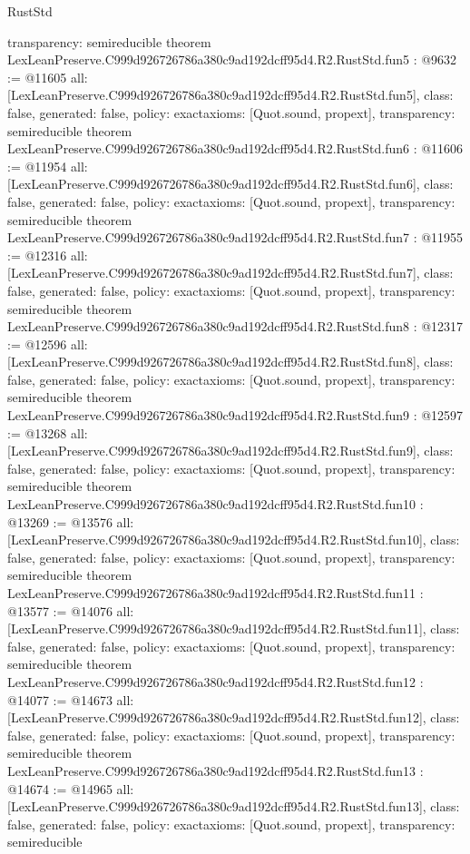 \begin{lexlean}{RustStd}
\begin{coremodule}
{  transparency: semireducible
}
theorem LexLeanPreserve.C999d926726786a380c9ad192dcff95d4.R2.RustStd.fun5 : @9632 := @11605 {
  all: [LexLeanPreserve.C999d926726786a380c9ad192dcff95d4.R2.RustStd.fun5],
  class: false,
  generated: false,
  policy: exact{axioms: [Quot.sound, propext]},
  transparency: semireducible
}
theorem LexLeanPreserve.C999d926726786a380c9ad192dcff95d4.R2.RustStd.fun6 : @11606 := @11954 {
  all: [LexLeanPreserve.C999d926726786a380c9ad192dcff95d4.R2.RustStd.fun6],
  class: false,
  generated: false,
  policy: exact{axioms: [Quot.sound, propext]},
  transparency: semireducible
}
theorem LexLeanPreserve.C999d926726786a380c9ad192dcff95d4.R2.RustStd.fun7 : @11955 := @12316 {
  all: [LexLeanPreserve.C999d926726786a380c9ad192dcff95d4.R2.RustStd.fun7],
  class: false,
  generated: false,
  policy: exact{axioms: [Quot.sound, propext]},
  transparency: semireducible
}
theorem LexLeanPreserve.C999d926726786a380c9ad192dcff95d4.R2.RustStd.fun8 : @12317 := @12596 {
  all: [LexLeanPreserve.C999d926726786a380c9ad192dcff95d4.R2.RustStd.fun8],
  class: false,
  generated: false,
  policy: exact{axioms: [Quot.sound, propext]},
  transparency: semireducible
}
theorem LexLeanPreserve.C999d926726786a380c9ad192dcff95d4.R2.RustStd.fun9 : @12597 := @13268 {
  all: [LexLeanPreserve.C999d926726786a380c9ad192dcff95d4.R2.RustStd.fun9],
  class: false,
  generated: false,
  policy: exact{axioms: [Quot.sound, propext]},
  transparency: semireducible
}
theorem LexLeanPreserve.C999d926726786a380c9ad192dcff95d4.R2.RustStd.fun10 : @13269 := @13576 {
  all: [LexLeanPreserve.C999d926726786a380c9ad192dcff95d4.R2.RustStd.fun10],
  class: false,
  generated: false,
  policy: exact{axioms: [Quot.sound, propext]},
  transparency: semireducible
}
theorem LexLeanPreserve.C999d926726786a380c9ad192dcff95d4.R2.RustStd.fun11 : @13577 := @14076 {
  all: [LexLeanPreserve.C999d926726786a380c9ad192dcff95d4.R2.RustStd.fun11],
  class: false,
  generated: false,
  policy: exact{axioms: [Quot.sound, propext]},
  transparency: semireducible
}
theorem LexLeanPreserve.C999d926726786a380c9ad192dcff95d4.R2.RustStd.fun12 : @14077 := @14673 {
  all: [LexLeanPreserve.C999d926726786a380c9ad192dcff95d4.R2.RustStd.fun12],
  class: false,
  generated: false,
  policy: exact{axioms: [Quot.sound, propext]},
  transparency: semireducible
}
theorem LexLeanPreserve.C999d926726786a380c9ad192dcff95d4.R2.RustStd.fun13 : @14674 := @14965 {
  all: [LexLeanPreserve.C999d926726786a380c9ad192dcff95d4.R2.RustStd.fun13],
  class: false,
  generated: false,
  policy: exact{axioms: [Quot.sound, propext]},
  transparency: semireducible
}
\end{coremodule}
\end{lexlean}
